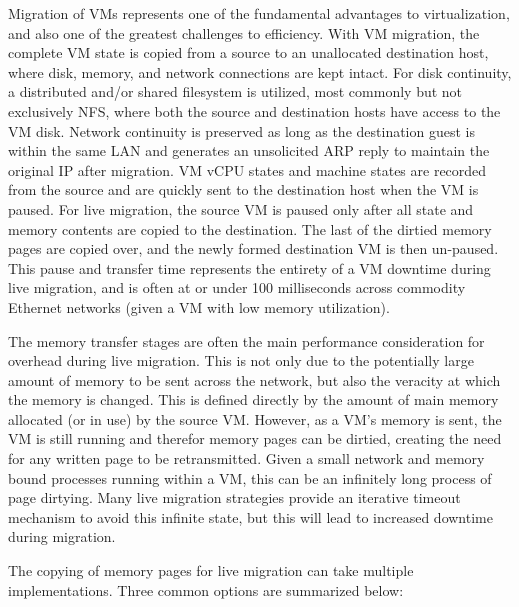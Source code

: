 Migration of VMs represents one of the fundamental advantages to virtualization, and also one of the greatest challenges to efficiency.  With VM migration, the complete VM state is copied from a source to an unallocated destination host, where disk, memory, and network connections are kept intact. For disk continuity, a distributed and/or shared filesystem is utilized, most commonly but not exclusively NFS, where both the source and destination hosts have access to the VM disk.  Network continuity is preserved as long as the destination guest is within the same LAN and generates an unsolicited ARP reply to maintain the original IP after migration.  VM vCPU states and machine states are recorded from the source and are quickly sent to the destination host when the VM is paused. For live migration, the source VM is paused only after all state and memory contents are copied to the destination. The last of the dirtied memory pages are copied over, and the newly formed destination VM is then un-paused.  This pause and transfer time represents the entirety of a VM downtime during live migration, and is often at or under 100 milliseconds across commodity Ethernet networks (given a VM with low memory utilization).  

The memory transfer stages are often the main performance consideration for overhead during live migration. This is not only due to the potentially large amount of memory to be sent across the network, but also the veracity at which the memory is changed.  This is defined directly by the amount of main memory allocated (or in use) by the source VM. However, as a VM's memory is sent, the VM is still running and therefor memory pages can be dirtied, creating the need for any written page to be retransmitted. Given a small network and memory bound processes running within a VM, this can be an infinitely long process of page dirtying. Many live migration strategies provide an iterative timeout mechanism to avoid this infinite state, but this will lead to increased downtime during migration.  

The copying of memory pages for live migration can take multiple implementations. Three common options are summarized below:

